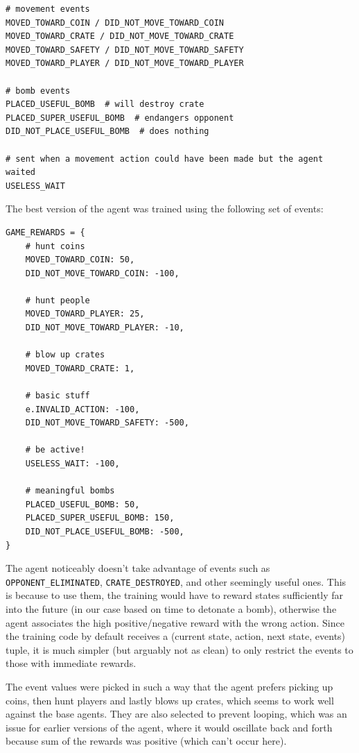 \documentclass{article}
\begin{document}
\begin{verbatim}
# movement events
MOVED_TOWARD_COIN / DID_NOT_MOVE_TOWARD_COIN
MOVED_TOWARD_CRATE / DID_NOT_MOVE_TOWARD_CRATE
MOVED_TOWARD_SAFETY / DID_NOT_MOVE_TOWARD_SAFETY
MOVED_TOWARD_PLAYER / DID_NOT_MOVE_TOWARD_PLAYER

# bomb events
PLACED_USEFUL_BOMB  # will destroy crate
PLACED_SUPER_USEFUL_BOMB  # endangers opponent
DID_NOT_PLACE_USEFUL_BOMB  # does nothing

# sent when a movement action could have been made but the agent waited
USELESS_WAIT   
\end{verbatim}

The best version of the agent was trained using the following set of events:

\begin{verbatim}
GAME_REWARDS = {
    # hunt coins
    MOVED_TOWARD_COIN: 50,
    DID_NOT_MOVE_TOWARD_COIN: -100,

    # hunt people
    MOVED_TOWARD_PLAYER: 25,
    DID_NOT_MOVE_TOWARD_PLAYER: -10,

    # blow up crates
    MOVED_TOWARD_CRATE: 1,

    # basic stuff
    e.INVALID_ACTION: -100,
    DID_NOT_MOVE_TOWARD_SAFETY: -500,

    # be active!
    USELESS_WAIT: -100,

    # meaningful bombs
    PLACED_USEFUL_BOMB: 50,
    PLACED_SUPER_USEFUL_BOMB: 150,
    DID_NOT_PLACE_USEFUL_BOMB: -500,
}
\end{verbatim}

The agent noticeably doesn't take advantage of events such as \texttt{OPPONENT\_ELIMINATED}, \texttt{CRATE\_DESTROYED}, and other seemingly useful ones.
This is because to use them, the training would have to reward states sufficiently far into the future (in our case based on time to detonate a bomb), otherwise the agent associates the high positive/negative reward with the wrong action.
Since the training code by default receives a (current state, action, next state, events) tuple, it is much simpler (but arguably not as clean) to only restrict the events to those with immediate rewards.

The event values were picked in such a way that the agent prefers picking up coins, then hunt players and lastly blows up crates, which seems to work well against the base agents.
They are also selected to prevent looping, which was an issue for earlier versions of the agent, where it would oscillate back and forth because sum of the rewards was positive (which can't occur here).
\end{document}

